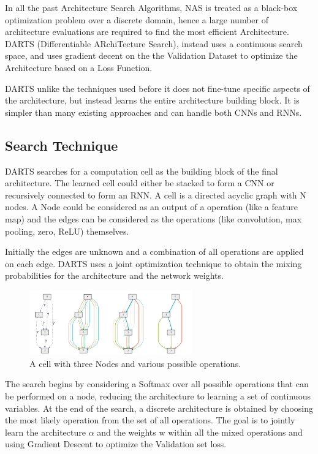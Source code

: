 \documentclass{ieee}
\begin{document}
In all the past Architecture Search Algorithms, NAS is treated as a black-box optimization problem over a discrete domain, hence a large number of architecture evaluations are required to find the most efficient Architecture. DARTS (Differentiable ARchiTecture Search), instead uses a continuous search space, and uses gradient decent on the the Validation Dataset to optimize the Architecture based on a Loss Function.

DARTS unlike the techniques used before it does not fine-tune specific aspects of the architecture, but instead learns the entire architecture building block.  It is simpler than many existing approaches and can handle both CNNs and RNNs.

\subsection{Search Technique}
DARTS searches for a computation cell as the building block of the final architecture. The learned cell could either be stacked to form a CNN or recursively connected to form an RNN. A cell is a directed acyclic graph with N nodes. A Node could be considered as an output of a operation (like a feature map) and the edges can be considered as the operations (like convolution, max pooling, zero, ReLU) themselves. 

Initially the edges are unknown and a combination of all operations are applied on each edge. DARTS uses a joint optimization technique to obtain the mixing probabilities for the architecture and the network weights.
 \begin{figure}[h]
    \begin{center}
    \includegraphics[width=7cm]{images/DARTS.png}
    \end{center}
    \label{mbconv_fig}
    \caption{A cell with three Nodes and various possible operations. \cite{CONVNETIMAGE}}
\end{figure}

The search begins by considering a Softmax over all possible operations that can be performed on a node, reducing the architecture to learning a set of continuous variables. At the end of the search, a discrete architecture is obtained by choosing the most likely operation from the set of all operations. The goal is to jointly learn the architecture $\alpha$ and the weights w within all the mixed operations and using Gradient Descent to optimize the Validation set loss.
\end{document}
